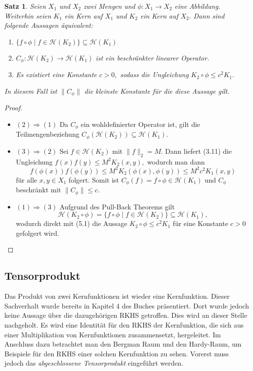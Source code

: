\documentclass[12pt,titlepage,twoside,cleardoublepage]{article}
\theoremstyle{nummermitklammern}
\newtheorem{satz}[temp]{Satz}
\newtheorem{satz}[zahl]{Satz}
\numberwithin{equation}{section}
\begin{document}
\begin{satz}
Seien $X_1$ und $X_2$ zwei Mengen und $\phi:X_1\to X_2$ eine Abbildung. Weiterhin seien $K_1$ ein Kern auf $X_1$ und $K_2$ ein Kern auf $X_2.$ Dann sind folgende Aussagen äquivalent:
\begin{enumerate}
\item $\{f\circ \phi \mid f\in \mathcal{H}(K_2)\}\subseteq \mathcal{H}(K_1)$
\item $C_{\phi}:\mathcal{H}(K_2)\to \mathcal{H}(K_1) $ ist ein beschränkter linearer Operator.
\item Es existiert eine Konstante $c>0,$ sodass die Ungleichung $K_2 \circ \phi \leq c^2K_1.$ 
\end{enumerate}
In diesem Fall ist $\|C_{\phi}\|$ die kleinste Konstante für die diese Aussage gilt.
\end{satz}
\begin{proof}
\begin{itemize}
\item $(2)\Rightarrow (1)$ Da $C_{\phi}$ ein wohldefinierter Operator ist, gilt die Teilmengenbeziehung $C_{\phi}(\mathcal{H}(K_2))\subseteq \mathcal{H}(K_1).$ 
\item $(3) \Rightarrow (2)$ Sei $f\in \mathcal{H}(K_2)$ mit $\|f\|_2=M.$ Dann liefert (3.11) die Ungleichung $f(x)f(y)\leq M^2K_2(x,y),$ wodurch man dann 
\[
f(\phi(x))f(\phi(y))\leq M^2K_2(\phi(x),\phi(y))\leq M^2c^2K_1(x,y)
\] für alle $x,y\in X_1$ folgert. Somit ist $C_{\phi}(f)=f\circ \phi\in \mathcal{H}(K_1)$ und $C_{\phi}$ beschränkt mit $\|C_{\phi}\|\leq c.$ 
\item $(1) \Rightarrow (3)$ Aufgrund des Pull-Back Theorems gilt
 \[
\mathcal{H}(K_2\circ \phi)=\{f\circ \phi\mid f\in \mathcal{H}(K_2)\}\subseteq \mathcal{H}(K_1), 
\] wodurch direkt mit (5.1) die Aussage $K_2\circ \phi \leq c^2K_1$ für eine Konstante $c> 0$ gefolgert wird. 
\end{itemize}
\end{proof}

\subsection{Tensorprodukt}
Das Produkt von zwei Kernfunktionen ist wieder eine Kernfunktion. Dieser Sachverhalt wurde bereits in Kapitel 4 des Buches präsentiert. Dort wurde jedoch keine Aussage über die dazugehörigen RKHS getroffen. Dies wird an dieser Stelle nachgeholt. Es wird eine Identität für den RKHS der Kernfunktion, die sich aus einer Multiplikation von Kernfunktionen zusammensetzt, hergeleitet. Im Anschluss dazu betrachtet man den Bergman Raum und den Hardy-Raum, um Beispiele für den RKHS einer solchen Kernfunktion zu sehen. Vorerst muss jedoch das \emph{abgeschlossene Tensorprodukt} eingeführt werden.
\end{document}
